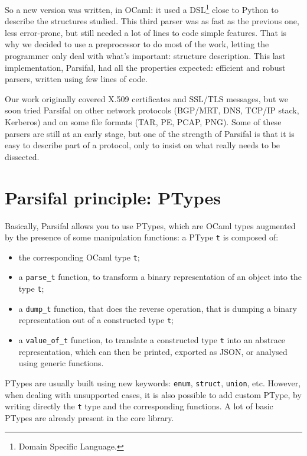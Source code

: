 \documentclass{article}
\begin{document}
So a new version was written, in OCaml: it used a DSL\footnote{Domain
  Specific Language.} close to Python to describe the structures
studied. This third parser was as fast as the previous one, less
error-prone, but still needed a lot of lines to code simple
features. That is why we decided to use a preprocessor to do most of
the work, letting the programmer only deal with what's important:
structure description. This last implementation, Parsifal, had all the
properties expected: efficient and robust parsers, written using few
lines of code.

Our work originally covered X.509 certificates and SSL/TLS messages,
but we soon tried Parsifal on other network protocols (BGP/MRT, DNS,
TCP/IP stack, Kerberos) and on some file formats (TAR, PE, PCAP,
PNG). Some of these parsers are still at an early stage, but one of
the strength of Parsifal is that it is easy to describe part of a
protocol, only to insist on what really needs to be dissected.



\section{Parsifal principle: PTypes}

Basically, Parsifal allows you to use PTypes, which are OCaml types
augmented by the presence of some manipulation functions: a PType
\texttt{t} is composed of:
\begin{itemize}
\item the corresponding OCaml type \texttt{t};
\item a \texttt{parse\_t} function, to transform a binary
  representation of an object into the type \texttt{t};
\item a \texttt{dump\_t} function, that does the reverse operation,
  that is dumping a binary representation out of a constructed type
  \texttt{t};
\item a \texttt{value\_of\_t} function, to translate a constructed
  type \texttt{t} into an abstrace representation, which can then be
  printed, exported as JSON, or analysed using generic functions.
\end{itemize}

PTypes are usually built using new keywords: \texttt{enum},
\texttt{struct}, \texttt{union}, etc. However, when dealing with
unsupported cases, it is also possible to add custom PType, by writing
directly the \texttt{t} type and the corresponding functions. A lot of
basic PTypes are already present in the core library.
\end{document}
